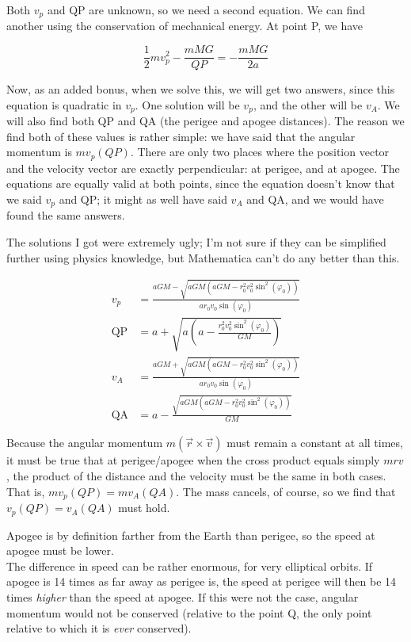 Both $v_p$ and QP are unknown, so we need a second equation. We can find another using the conservation of mechanical energy. At point P, we have

\begin{equation}
\frac{1}{2} m v_p^2 - \frac{m M G}{QP} = - \frac{m M G}{2a}
\end{equation}

Now, as an added bonus, when we solve this, we will get two answers, since this equation is quadratic in $v_p$. One solution will be $v_p$, and the other will be $v_A$. We will also find both QP and QA (the perigee and apogee distances). The reason we find both of these values is rather simple: we have said that the angular momentum is $m v_p (QP)$. There are only two places where the position vector and the velocity vector are exactly perpendicular: at perigee, and at apogee. The equations are equally valid at both points, since the equation doesn't know that we said $v_p$ and QP; it might as well have said $v_A$ and QA, and we would have found the same answers.

The solutions I got were extremely ugly; I'm not sure if they can be simplified further using physics knowledge, but Mathematica can't do any better than this.

\begin{align}
v_p        &= \frac{a G M - \sqrt{a G M \left(a G M- r_0^2 v_0^2 \sin^2 (\varphi_0)\right)}}{a r_0 v_0 \sin (\varphi_0) }\\
\text{QP}  &= a + \sqrt{a\left(a - \frac{r_0^2 v_0^2 \sin^2(\varphi_0)}{G M}\right)}\\
v_A        &= \frac{a G M + \sqrt{a G M \left(a G M- r_0^2 v_0^2 \sin^2 (\varphi_0)\right)}}{a r_0 v_0 \sin (\varphi_0)}\\
\text{QA}  &= a - \frac{\sqrt{a G M(a G M - r_0^2 v_0^2 \sin^2(\varphi_0))}}{G M}
\end{align}

Because the angular momentum $m(\vec{r} \times \vec{v})$ must remain a constant at all times, it must be true that at perigee/apogee when the cross product equals simply $m r v$, the product of the distance and the velocity must be the same in both cases. That is, $m v_p (QP) = m v_A (QA)$. The mass cancels, of course, so we find that $v_p (QP) = v_A (QA)$ must hold.

Apogee is by definition farther from the Earth than perigee, so the speed at apogee must be lower.\\
The difference in speed can be rather enormous, for very elliptical orbits. If apogee is 14 times as far away as perigee is, the speed at perigee will then be 14 times \emph{higher} than the speed at apogee. If this were not the case, angular momentum would not be conserved (relative to the point Q, the only point relative to which it is \emph{ever} conserved).

